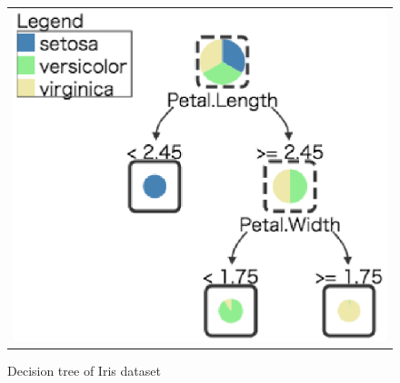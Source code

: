 \begin{figure}[htbp]
\begin{center}
\begin{tabular}{c}

\begin{minipage}{0.5\hsize}
\begin{center}
\includegraphics[scale=0.5]{figure/tree_3.eps}
\caption{Decision tree of Iris dataset\label{fig:mdtree_tree_3}}
\end{center}
\end{minipage}

\end{tabular}
\end{center}
\end{figure}

